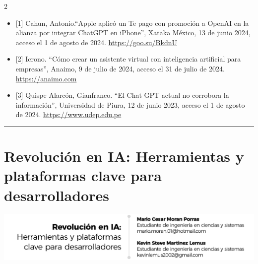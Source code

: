 \documentclass[12pt,spanish,Letterpaper,openany]{book}
\newcommand{\HRule}{\begin{center}\rule{0.5\linewidth}{0.2mm}\end{center}}
\begin{document}
\begin {multicols}{2}
\begin{itemize}
\item
  {[}1{]} Cahun, Antonio.``Apple aplicó un Te pago con promoción a OpenAI en la alianza por integrar ChatGPT en iPhone'', Xataka México, 13 de junio 2024, acceso el 1 de agosto de 2024. \url{https://goo.su/BkdnU}
\item
  {[}2{]} Icrono. ``Cómo crear un asistente virtual con inteligencia artificial para empresas'', Anaimo, 9 de julio de 2024, acceso el 31 de julio de 2024. \href{https://anaimo.com/como-crear-un-asistente-virtual-con-inteligencia-artificial-para-empresas/}{https://anaimo.com}
\item
  {[}3{]} Quispe Alarcón, Gianfranco. ``El Chat GPT actual no corrobora la información'', Universidad de Piura, 12 de junio 2023, acceso el 1 de agosto de 2024.
  \href{https://www.udep.edu.pe/hoy/2023/06/el-chat-gpt-actual-no-corrobora-la-informacion/}{https://www.udep.edu.pe}
\end{itemize}

\end {multicols}

\medskip

\HRule

\medskip

\hypertarget{pareja43}{%
\chapter{Revolución en IA: Herramientas y plataformas clave para desarrolladores}\label{pareja43}}

\begin{center}\includegraphics[width=1\linewidth]{autores/pareja43_01} \end{center}
\end{document}

